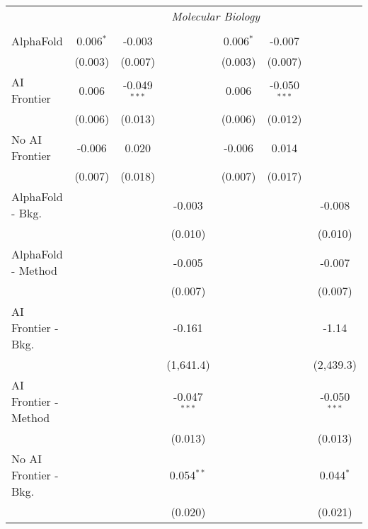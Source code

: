 \begin{tabular}{lcccccc}
 & \multicolumn{6}{c}{\textit{Molecular Biology}} \\ \\
   AlphaFold               & 0.006$^{*}$ & -0.003         &                & 0.006$^{*}$ & -0.007         &   \\   
                           & (0.003)     & (0.007)        &                & (0.003)     & (0.007)        &   \\   
   AI Frontier             & 0.006       & -0.049$^{***}$ &                & 0.006       & -0.050$^{***}$ &   \\   
                           & (0.006)     & (0.013)        &                & (0.006)     & (0.012)        &   \\   
   No AI Frontier          & -0.006      & 0.020          &                & -0.006      & 0.014          &   \\   
                           & (0.007)     & (0.018)        &                & (0.007)     & (0.017)        &   \\   
   AlphaFold - Bkg.        &             &                & -0.003         &             &                & -0.008\\   
                           &             &                & (0.010)        &             &                & (0.010)\\   
   AlphaFold - Method      &             &                & -0.005         &             &                & -0.007\\   
                           &             &                & (0.007)        &             &                & (0.007)\\   
   AI Frontier - Bkg.      &             &                & -0.161         &             &                & -1.14\\   
                           &             &                & (1,641.4)      &             &                & (2,439.3)\\   
   AI Frontier - Method    &             &                & -0.047$^{***}$ &             &                & -0.050$^{***}$\\   
                           &             &                & (0.013)        &             &                & (0.013)\\   
   No AI Frontier - Bkg.   &             &                & 0.054$^{**}$   &             &                & 0.044$^{*}$\\   
                           &             &                & (0.020)        &             &                & (0.021)\\   

\end{tabular}
